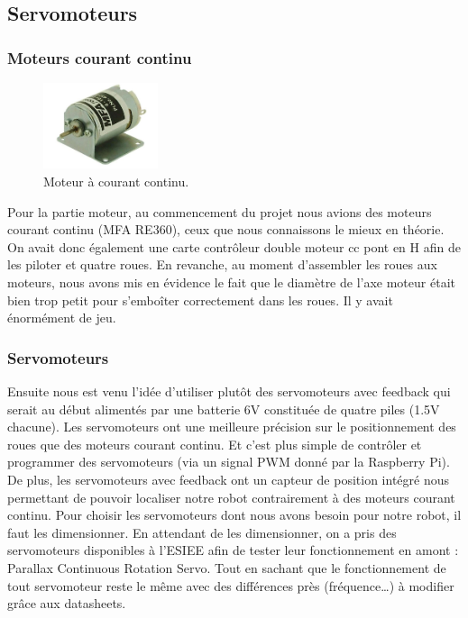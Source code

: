 \documentclass[a4paper,12pt]{report}  %
\begin{document}
\subsection{Servomoteurs}
\subsubsection{Moteurs courant continu}
\begin{figure}[H]
	\centering
	\includegraphics[width=0.3\textwidth]{./attachments/moteur_continu.jpg}
	\caption{Moteur à courant continu.}
	
\end{figure}

Pour la partie moteur, au commencement du projet nous avions des moteurs courant continu (MFA RE360), ceux que nous connaissons le mieux en théorie. On avait donc également une carte contrôleur double moteur cc pont en H afin de les piloter et quatre roues. En revanche, au moment d’assembler les roues aux moteurs, nous avons mis en évidence le fait que le diamètre de l’axe moteur était bien trop petit pour s’emboîter correctement dans les roues. Il y avait énormément de jeu. \\

\subsubsection{Servomoteurs}
Ensuite nous est venu l’idée d’utiliser plutôt des servomoteurs avec feedback qui serait au début alimentés par une batterie 6V constituée de quatre piles (1.5V chacune).
Les servomoteurs ont une meilleure précision sur le positionnement des roues que des moteurs courant continu. Et c’est plus simple de contrôler et programmer des servomoteurs (via un signal PWM donné par la Raspberry Pi). De plus, les servomoteurs avec feedback ont un capteur de position intégré nous permettant de pouvoir localiser notre robot contrairement à des moteurs courant continu. 
Pour choisir les servomoteurs dont nous avons besoin pour notre robot, il faut les dimensionner. En attendant de les dimensionner, on a pris des servomoteurs disponibles à l’ESIEE afin de tester leur fonctionnement en amont : Parallax Continuous Rotation Servo. Tout en sachant que le fonctionnement de tout servomoteur reste le même avec des différences près (fréquence…) à modifier grâce aux datasheets. \\
\end{document}
